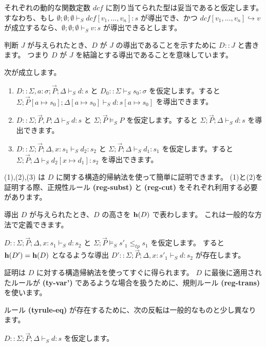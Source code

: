 \documentclass[submit,techreq,noauthor,onecolumn]{ipsj}
\begin{document}
\noindent それぞれの動的な関数定数 $dcf$ に割り当てられた型は妥当であると仮定します。
すなわち、もし $\emptyset;\emptyset;\emptyset \vdash_S dcf[v_1,\ldots,v_n]:s$ が導出でき、かつ $dcf[v_1,\ldots,v_n] \hookrightarrow v$ が成立するなら、$\emptyset;\emptyset;\emptyset \vdash_S v:s$ が導出できるとします。

判断 $J$ が与えられたとき、$D$ が $J$ の導出であることを示すために $D :: J$ と書きます。
つまり $D$ が $J$ を結論とする導出であることを意味しています。

 次が成立します。

\begin{enumerate}
  \item $D :: \Sigma,a : \sigma; \vec{P}; \Delta \vdash_S d:s$ と $D_0 :: \Sigma \vdash_S s_0 : \sigma$ を仮定します。すると $\Sigma; \vec{P}[a \mapsto s_0]; \Delta[a \mapsto s_0] \vdash_S d:s[a \mapsto s_0]$ を導出できます。
  \item $D :: \Sigma; \vec{P},P; \Delta \vdash_S d:s$ と $\Sigma; \vec{P} \models_S P$ を仮定します。すると $\Sigma; \vec{P}; \Delta \vdash_S d:s$ を導出できます。
  \item $D :: \Sigma; \vec{P}; \Delta, x:s_1 \vdash_S d_2:s_2$ と $\Sigma; \vec{P}; \Delta \vdash_S d_1:s_1$ を仮定します。すると $\Sigma; \vec{P}; \Delta \vdash_S d_2[x \mapsto d_1]:s_2$ を導出できます。
\end{enumerate}

(1),(2),(3) は $D$ に関する構造的帰納法を使って簡単に証明できます。
(1)と(2)を証明する際、正規性ルール {\bf (reg-subst)} と {\bf (reg-cut)} をそれぞれ利用する必要があります。

\noindent 導出 $D$ が与えられたとき、$D$ の高さを ${\bf h}(D)$ で表わします。
これは一般的な方法で定義できます。

$D :: \Sigma; \vec{P}; \Delta, x:s_1 \vdash_S d:s_2$ と $\Sigma; \vec{P} \models_S s'_1 \leq_{tp} s_1$ を仮定します。
すると ${\bf h}(D') = {\bf h}(D)$ となるような導出 $D' :: \Sigma; \vec{P}; \Delta,x:s'_1 \vdash_S d:s_2$ が存在します。

証明は $D$ に対する構造帰納法を使ってすぐに得られます。
$D$ に最後に適用されたルールが {\bf (ty-var')} であるような場合を扱うために、規則ルール {\bf (reg-trans)} を使います。

ルール {\bf (tyrule-eq)} が存在するために、次の反転は一般的なものと少し異なります。

$D::\Sigma; \vec{P}; \Delta \vdash_S d:s$ を仮定します。
\end{document}
